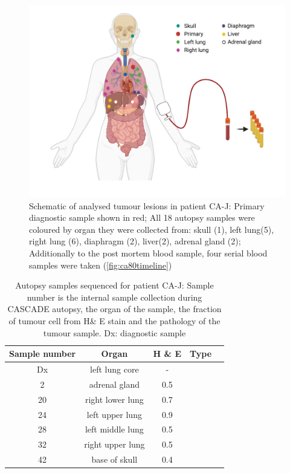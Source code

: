 \begin{figure}[ht]
\centering
\includegraphics[width=.99\linewidth]{Figures/CASCADE/CA80/CA-J_schematic_CA80_organColours}
\caption[Schematic of analysed tumour lesions in patient CA-J]{Schematic of analysed tumour lesions in patient CA-J: Primary diagnostic sample shown in red; All 18 autopsy samples were coloured by organ they were collected from: skull (1), left lung(5), right lung (6), diaphragm (2), liver(2), adrenal gland (2); Additionally to the post mortem blood sample, four serial blood samples were taken (\protect\autoref{fig:ca80timeline})} \label{fig:ca80schematic}
\end{figure}

\begin{table}[ht]
\caption[Autopsy samples sequenced for patient CA-J]{Autopsy samples sequenced for patient CA-J: Sample number is the internal sample collection during CASCADE autopsy, the organ of the sample, the fraction of tumour cell from H\& E stain and the pathology of the tumour sample. Dx: diagnostic sample}\label{tab:ca80wgsSamples}
\centering
{}
\begin{tabular}{|c|c|c|c|c|}
\toprule
\hline
 \rowcolor{gray!50}
\textbf{Sample number} & \textbf{Organ} & \textbf{H \& E} & \textbf{Type}\\
\hline
 Dx & left lung core & - & \cellcolor{white} \\
 2 & adrenal gland & 0.5 & \cellcolor{white} \\
 20 & right lower lung & 0.7 & \cellcolor{white} \\
 24 & left upper lung & 0.9 & \cellcolor{white} \\
 28 & left middle lung & 0.5 & \cellcolor{white} \\
 32 & right upper lung & 0.5 & \cellcolor{white} \\
 42 & base of skull & 0.4 & \cellcolor{white}\multirow{-7}{*}{adenocarcinoma} \\
 \hline
\bottomrule
\end{tabular}
\end{table} 

